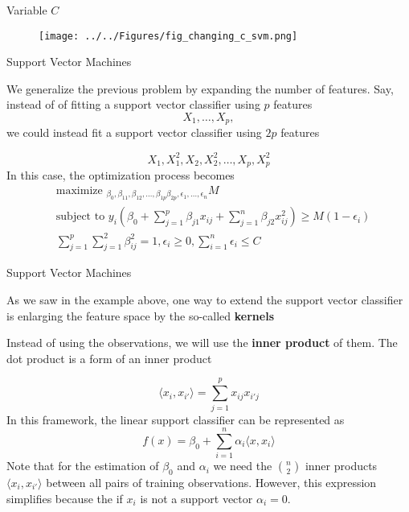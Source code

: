 \documentclass{beamer}
\begin{document}
\begin{frame}{Variable $C$}
	
		\begin{figure}[h]
	\centering
	\texttt{[image: ../../Figures/fig\_changing\_c\_svm.png]}
\end{figure}
	
\end{frame}

\begin{frame}{Support Vector Machines}
	
	We generalize the previous problem by expanding the number of features. Say, instead of of fitting a support vector classifier using $p$ features
	\begin{equation*}
		X_1,\ldots, X_p,
	\end{equation*}
we could instead fit a support vector classifier using $2p$ features 

\begin{equation*}
	X_1,X_1^2,X_2,X_2^2,\ldots, X_p,X_p^2
\end{equation*}
In this case, the optimization process becomes
\begin{equation*}
	\begin{split}
		&\textrm{maximize }_{\beta_0,\beta_{11},\beta_{12},\ldots,\beta_{1p} \beta_{2p},\epsilon_1,\ldots,\epsilon_n} M \\
		&\textrm{subject to } y_i (\beta_0 + \sum_{j=1}^p \beta_{j1} x_{ij} + \sum_{j=1}^n \beta_{j2}x_{ij}^2)\ge M (1-\epsilon_i) \\
		&\sum_{j=1}^p \sum_{j=1}^2 \beta_{ij}^2 =1 ,  \epsilon_i \ge 0, \sum_{i=1}^n \epsilon_i \le C 
	\end{split}
\end{equation*}
\end{frame}

\begin{frame}{Support Vector Machines}
	
	As we saw in the example above,  one way to extend the support vector classifier is enlarging the feature space by the so-called {\bf kernels}
	
	Instead of using the observations, we will use the {\bf inner product}  of them. The dot product is a form of an inner product
	
	\begin{equation*}
		\langle  x_i, x_{i'} \rangle = \sum_{j=1}^p x_{ij} x_{i'j}
	\end{equation*}
	In this framework, the linear support classifier can be represented as
	\begin{equation*}
		f(x) =\beta_0 + \sum_{i=1}^n \alpha_i \langle x,x_i \rangle
	\end{equation*}
Note that for the estimation of $\beta_0$ and $\alpha_i$ we need the $n \choose 2$ inner products $\langle x_i,x_{i'} \rangle$ between all pairs of training observations. However, this expression simplifies because the if $x_i$ is not a support vector $\alpha_i=0$. 
\end{frame}
\end{document}
